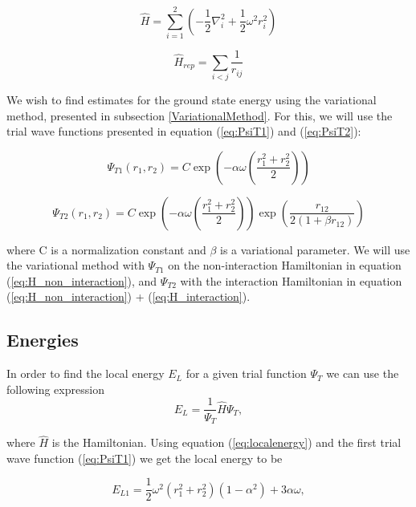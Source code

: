 \documentclass[norsk,a4paper,12pt]{article}
\begin{document}
\begin{equation}
    \hat{H} = \sum_{i=1}^{2} (-\frac{1}{2}\nabla_i^2 + \frac{1}{2} \omega^2r_i^2) 
    \label{eq:H_non_interaction}
\end{equation}

\begin{equation}
    \hat{H}_{rep} = \sum_{i<j} \frac{1}{r_{ij}}
    \label{eq:H_interaction}
\end{equation}

We wish to find estimates for the ground state energy using the variational method, presented in subsection \ref{VariationalMethod}. For this, we will use the trial wave functions presented in equation (\ref{eq:PsiT1}) and (\ref{eq:PsiT2}):

\begin{equation}
    \Psi_{T1} (r_1, r_2) = C\exp(-\alpha \omega (\frac{r_1^2 + r_2^2}{2}))
    \label{eq:PsiT1}
\end{equation}

\begin{equation}
    \Psi_{T2}(r_1, r_2) = C\exp(-\alpha \omega (\frac{r_1^2 + r_2^2}{2}))\exp(\frac{r_{12}}{2(1+\beta r_{12})})
    \label{eq:PsiT2}
\end{equation}

where C is a normalization constant and $\beta$ is a variational parameter. We will use the variational method with $\Psi_{T1}$ on the non-interaction Hamiltonian in equation (\ref{eq:H_non_interaction}), and $\Psi_{T2}$ with the interaction Hamiltonian in equation (\ref{eq:H_non_interaction}) + (\ref{eq:H_interaction}).

\subsection{Energies} \label{Energies}
In order to find the local energy $E_L$ for a given trial function $\Psi_T$ we can use the following expression
\begin{equation}
E_L = \frac{1}{\Psi_T}\hat{H}\Psi_T,
\label{eq:localenergy}
\end{equation}

where $\hat{H}$ is the Hamiltonian. Using equation (\ref{eq:localenergy}) and the first trial wave function (\ref{eq:PsiT1}) we get the local energy to be

\begin{equation}
E_{L1} = \frac{1}{2}\omega^2 (r_1^2 + r_2^2)(1-\alpha^2) + 3\alpha \omega,
\label{eq:EL1}
\end{equation}
\end{document}

